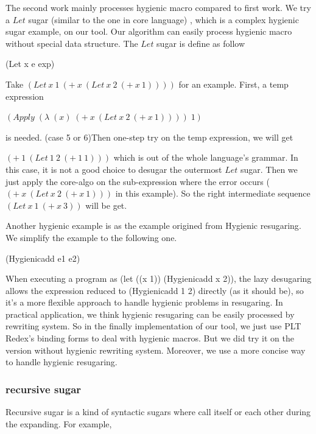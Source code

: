 The second work\cite{hygienic} mainly processes hygienic macro compared to first work. We try a $Let$ sugar (similar to the one in core language) , which is a complex hygienic sugar example, on our tool. Our algorithm can easily process hygienic macro without special data structure. The $Let$ sugar is define as follow
\begin{Codes}
	(Let x e exp) 
\end{Codes}

Take $(Let~x~1~(+~x~(Let~x~2~(+~x~1))))$ for an example. First, a temp expression

$(Apply\;(\lambda\;(x)\;(+~x~(Let~x~2~(+~x~1))))\;1)$

is needed. (case 5 or 6)Then one-step try on the temp expression, we will get

$(+~1~(Let~1~2~(+~1~1)))$ which is out of the whole language's grammar. In this case, it is not a good choice to desugar the outermost $Let$ sugar. Then we just apply the core-algo on the sub-expression where the error occurs ($(+~x~(Let~x~2~(+~x~1)))$ in this example). So the right intermediate sequence $(Let~x~1~(+~x~3))$ will be get.

Another hygienic example is as the example origined from Hygienic resugaring\cite{hygienic}. We simplify the example to the following one.
\begin{Codes}
	(Hygienicadd e1 e2) 
\end{Codes}


When executing a program as (let ((x 1)) (Hygienicadd x 2)), the lazy desugaring allows the expression reduced to (Hygienicadd 1 2) directly (as it should be), so it's a more flexible approach to handle hygienic problems in resugaring.
In practical application, we think hygienic resugaring can be easily processed by rewriting system. So in the finally implementation of our tool, we just use PLT Redex's binding forms to deal with hygienic macros. But we did try it on the version without hygienic rewriting system. Moreover, we use a more concise way to handle hygienic resugaring.

\subsubsection{recursive sugar}
Recursive sugar is a kind of syntactic sugars where call itself or each other during the expanding. For example,

